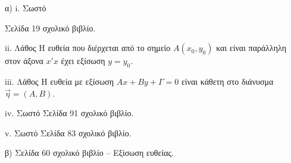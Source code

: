 α)
i. Σωστό

Σελίδα 19 σχολικό βιβλίο.

ii. Λάθος
Η ευθεία που διέρχεται από το σημείο $A(x_0, y_0)$ και είναι παράλληλη στον άξονα $x'x$ έχει εξίσωση $y = y_0$.

iii. Λάθος
Η ευθεία με εξίσωση $Ax + By + \Gamma = 0$ είναι κάθετη στο διάνυσμα $\vec{\eta} = (A,B)$.

iv. Σωστό
Σελίδα 91 σχολικό βιβλίο.

v. Σωστό
Σελίδα 83 σχολικό βιβλίο.

β) Σελίδα 60 σχολικό βιβλίο – Εξίσωση ευθείας.